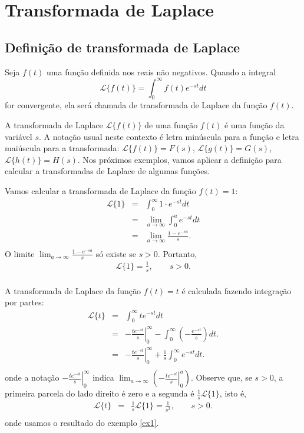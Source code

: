 \chapter{Transformada de Laplace}
\section{Definição de transformada de Laplace}{\label{sec_1}}
\begin{defn}Seja $f(t)$ uma função definida nos reais não negativos. Quando a integral
\begin{equation}
{\mathcal{L}}\{f(t)\}=\int_0^\infty f(t)e^{-st}dt
\end{equation}
for convergente, ela será chamada de transformada de Laplace da função $f(t)$.
\end{defn}
A transformada de Laplace $\mathcal{L}\{f(t)\}$ de uma função $f(t)$ é uma função da variável $s$. A notação usual neste contexto é letra minúscula para a função e letra maiúscula para a transformada: $\mathcal{L}\{f(t)\}=F(s)$, $\mathcal{L}\{g(t)\}=G(s)$, $\mathcal{L}\{h(t)\}=H(s)$.
Nos próximos exemplos, vamos aplicar a definição para calcular a transformadas de Laplace de algumas funções.
\begin{ex}\label{ex1} Vamos calcular a transformada de Laplace da função $f(t)=1$:
\begin{eqnarray*}
\mathcal{L}\{1\}&=&\int_0^\infty 1\cdot e^{-st}dt\\
&=&\lim_{a\to\infty}\int_0^a  e^{-st}dt\\
&=&\lim_{a\to\infty} \frac{1-e^{-sa}}{s}.\\
\end{eqnarray*}
O limite $\displaystyle\lim_{a\to\infty}\frac{1-e^{-sa}}{s}$ só existe se $s>0$. Portanto,
\begin{eqnarray*}
\mathcal{L}\{1\}=\frac{1}{s},\qquad s>0.\\
\end{eqnarray*}
\end{ex}
\begin{ex}\label{ex2} A transformada de Laplace da função $f(t)=t$ é calculada fazendo integração por partes:
\begin{eqnarray*}
\mathcal{L}\{t\}&=&\int_0^\infty te^{-st}dt\\
&=&\left.-\frac{te^{-st}}{s}\right|_0^\infty-\int_0^\infty \left(-\frac{e^{-st}}{s}\right)dt .\\
&=&\left.-\frac{te^{-st}}{s}\right|_0^\infty+\frac{1}{s}\int_0^\infty e^{-st}dt .\\
\end{eqnarray*}
onde a notação $\displaystyle\left.-\frac{te^{-st}}{s}\right|_0^\infty$ indica $\displaystyle\lim_{a\to\infty}\left(\left.-\frac{te^{-st}}{s} \right|_0^a\right)$. Observe que, se $s>0$, a primeira parcela do lado direito é zero e a segunda é $\frac{1}{s}\mathcal{L}\{1\}$, isto é,
\begin{eqnarray*}
\mathcal{L}\{t\}&=&\frac{1}{s}\mathcal{L}\{1\}=\frac{1}{s^2},\qquad s>0.\\
\end{eqnarray*}
onde usamos o resultado do exemplo \ref{ex1}.
\end{ex}

